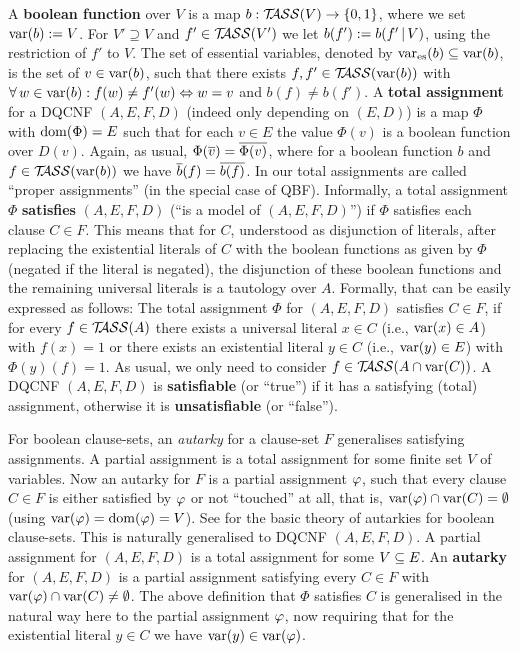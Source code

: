 \documentclass[conference]{IEEEtran}
\DeclareMathOperator{\varess}{\var_{es}} %
\begin{document}
A \textbf{boolean function} over $V$ is a map $b: \mathcal{T\hspace{-0.35em}ASS}(V) \rightarrow \{ 0,1 \}$, where we set $\operatorname{var}(b) := V$. For $V' \supseteq V$ and $f' \in \mathcal{T\hspace{-0.35em}ASS}(V')$ we let $b(f') := b(f' \operatorname{|} V)$, using the restriction of $f'$ to $V$.
The set of essential variables, denoted by $\varess(b) \sse \var(b)$, is the set of $v \in \operatorname{var}(b)$, such that there exists $f, f' \in \mathcal{T\hspace{-0.35em}ASS}(\operatorname{var}(b))$ with $\forall\, w \in \operatorname{var}(b) : f(w) \ne f'(w) \Leftrightarrow w = v$ and $b(f) \ne b(f')$.
A \textbf{total assignment} for a DQCNF $(A,E,F,D)$ (indeed only depending on $(E,D)$) is a map $\Phi$ with $\operatorname{dom}(\Phi) = E$ such that for each $v \in E$ the value $\Phi(v)$ is a boolean function over $D(v)$. Again, as usual, $\Phi(\overline v) = \overline{\Phi(v)}$, where for a boolean function $b$ and $f \in \mathcal{T\hspace{-0.35em}ASS}(\operatorname{var}(b))$ we have $\overline{b}(f) = \overline{b(f)}$. In \cite[Section 1]{HKBSubramaniZhao2003BooleanModels} our total assignments are called ``proper assignments'' (in the special case of QBF).
Informally, a total assignment $\Phi$ \textbf{satisfies} $(A,E,F,D)$ (``is a model of $(A,E,F,D)$'') if $\Phi$ satisfies each clause $C \in F$. This means that for $C$, understood as disjunction of literals, after replacing the existential literals of $C$ with the boolean functions as given by $\Phi$ (negated if the literal is negated), the disjunction of these boolean functions and the remaining universal literals is a tautology over $A$. Formally, that can be easily expressed as follows: The total assignment $\Phi$ for $(A,E,F,D)$ satisfies $C \in F$, if for every $f \in \mathcal{T\hspace{-0.35em}ASS}(A)$ there exists a universal literal $x \in C$ (i.e., $\operatorname{var}(x) \in A$) with $f(x) = 1$ or there exists an existential literal $y \in C$ (i.e., $\operatorname{var}(y) \in E$) with $\Phi(y)(f) = 1$. As usual, we only need to consider $f \in \mathcal{T\hspace{-0.35em}ASS}(A \cap \operatorname{var}(C))$.
A DQCNF $(A,E,F,D)$ is \textbf{satisfiable} (or ``true'') if it has a satisfying (total) assignment, otherwise it is \textbf{unsatisfiable} (or ``false'').

For boolean clause-sets, an \emph{autarky} for a clause-set $F$ generalises satisfying assignments. A partial assignment is a total assignment for some finite set $V$ of variables. Now an autarky for $F$ is a partial assignment $\varphi$, such that every clause $C \in F$ is either satisfied by $\varphi$ or not ``touched'' at all, that is, $\operatorname{var}(\varphi) \cap \operatorname{var}(C) = \emptyset$ (using $\operatorname{var}(\varphi) = \operatorname{dom}(\varphi) = V$). See \cite{Kullmann2007HandbuchMU} for the basic theory of autarkies for boolean clause-sets.
This is naturally generalised to DQCNF $(A,E,F,D)$. A partial assignment for $(A,E,F,D)$ is a total assignment for some $V \subseteq E$.
An \textbf{autarky} for $(A,E,F,D)$ is a partial assignment satisfying every $C \in F$ with $\operatorname{var}(\varphi) \cap \operatorname{var}(C) \ne \emptyset$.
The above definition that $\Phi$ satisfies $C$ is generalised in the natural way here to the partial assignment $\varphi$, now requiring that for the existential literal $y \in C$ we have $\operatorname{var}(y) \in \operatorname{var}(\varphi)$.
\end{document}
